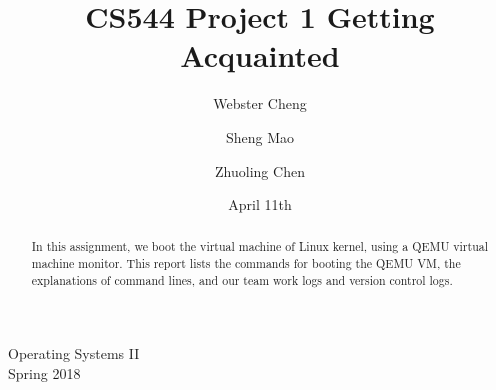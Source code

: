 \documentclass[english,10pt,letterpaper,onecolumn]{IEEEtran}
\title{CS544 Project 1 Getting Acquainted}
\author{
  Webster Cheng \hspace{1cm}
  \and
  Sheng Mao \hspace{1cm}
  \and
  Zhuoling Chen
}
\date{April 11th}
\begin{document}
\begin{titlepage} 
\maketitle
\begin{center}
 Operating Systems II \\
Spring 2018
\vspace{50 mm}
\end{center}
\begin{abstract}

In this assignment, we boot the virtual machine of Linux kernel, using a QEMU virtual machine monitor. This report lists the commands for booting the QEMU VM, the explanations of command lines, and our team work logs and version control logs.
\end{abstract}
\end{titlepage}
 
\end{document}
